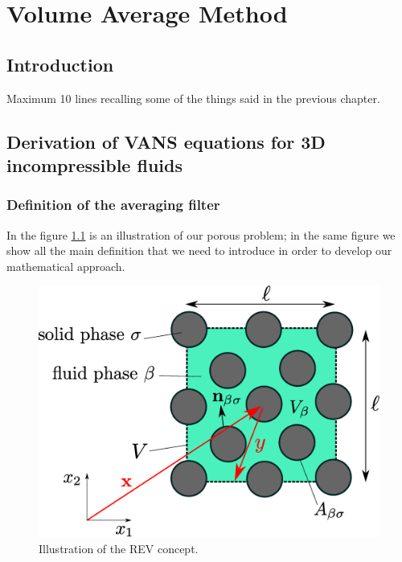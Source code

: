 \chapter{Volume Average Method}
\label{ch:vans}

\section{Introduction}

Maximum 10 lines recalling some of the things said in the previous chapter.

\section{Derivation of VANS equations for 3D incompressible fluids}
%

\subsection{Definition of the averaging filter}

In the figure \ref{fig:rev} is an illustration of our porous problem; in the same figure we show all the main definition that we need to introduce in order to develop our mathematical approach.


\begin{figure}[h]
	\centering
	\includegraphics[width=0.7\linewidth]{chapter_2/figure/REV}
	\caption{Illustration of the REV concept.}
	\label{fig:rev}
\end{figure}

